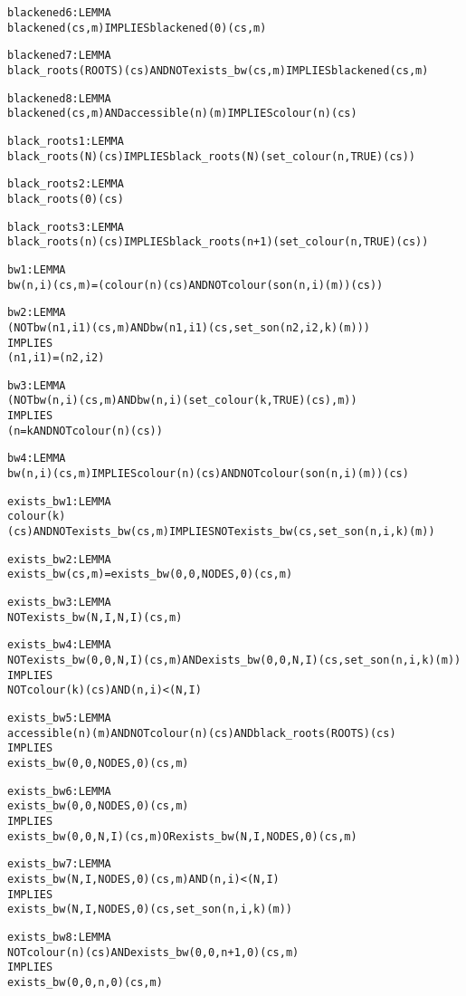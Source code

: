 \begin{alltt}
  blackened6 : LEMMA 
    blackened(cs, m) IMPLIES blackened(0)(cs, m)
  
  blackened7 : LEMMA 
    black_roots(ROOTS)(cs) AND NOT exists_bw(cs, m) IMPLIES blackened(cs, m)
  
  blackened8 : LEMMA 
    blackened(cs, m) AND accessible(n)(m) IMPLIES colour(n)(cs)
  
  black_roots1 : LEMMA 
    black_roots(N)(cs) IMPLIES black_roots(N)(set_colour(n, TRUE)(cs))
  
  black_roots2 : LEMMA 
    black_roots(0)(cs)
  
  black_roots3 : LEMMA 
    black_roots(n)(cs) IMPLIES black_roots(n + 1)(set_colour(n, TRUE)(cs))
  
  bw1 : LEMMA 
    bw(n, i)(cs, m) = (colour(n)(cs) AND NOT colour(son(n, i)(m))(cs))
  
  bw2 : LEMMA
    (NOT bw(n1, i1)(cs, m) AND bw(n1, i1)(cs, set_son(n2, i2, k)(m)))
      IMPLIES 
    (n1, i1) = (n2, i2)
  
  bw3: LEMMA
    (NOT bw(n, i)(cs, m) AND bw(n, i)(set_colour(k, TRUE)(cs), m))
      IMPLIES 
    (n = k AND NOT colour(n)(cs))
  
  bw4 : LEMMA 
    bw(n, i)(cs, m) IMPLIES colour(n)(cs) AND NOT colour(son(n, i)(m))(cs)
  
  exists_bw1 : LEMMA
    colour(k)(cs) AND NOT exists_bw(cs, m) IMPLIES NOT exists_bw(cs, set_son(n, i, k)(m))
  
  exists_bw2 : LEMMA 
    exists_bw(cs, m) = exists_bw(0, 0, NODES, 0)(cs, m)
  
  exists_bw3 : LEMMA 
    NOT exists_bw(N, I, N, I)(cs, m)
  
  exists_bw4 : LEMMA
    NOT exists_bw(0, 0, N, I)(cs, m) AND exists_bw(0, 0, N, I)(cs, set_son(n, i, k)(m))
      IMPLIES 
    NOT colour(k)(cs) AND (n, i) < (N, I)
  
  exists_bw5 : LEMMA
    accessible(n)(m) AND NOT colour(n)(cs) AND black_roots(ROOTS)(cs)
      IMPLIES 
    exists_bw(0, 0, NODES, 0)(cs, m)
  
  exists_bw6 : LEMMA
    exists_bw(0, 0, NODES, 0)(cs, m)
      IMPLIES 
    exists_bw(0, 0, N, I)(cs, m) OR exists_bw(N, I, NODES, 0)(cs, m)
  
  exists_bw7 : LEMMA
    exists_bw(N, I, NODES, 0)(cs, m) AND (n, i) < (N, I)
      IMPLIES 
    exists_bw(N, I, NODES, 0)(cs, set_son(n, i, k)(m))
  
  exists_bw8 : LEMMA
    NOT colour(n)(cs) AND exists_bw(0, 0, n + 1, 0)(cs, m)
      IMPLIES 
    exists_bw(0, 0, n, 0)(cs, m)
  

\end{alltt}
